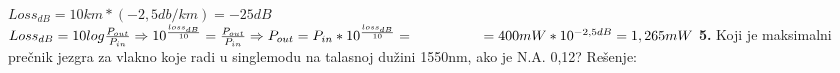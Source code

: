 \documentclass{article}
\begin{document}
$Loss_{dB} = 10km*(-2,5db/km) = -25dB$
\vspace{0.2cm} \newline
\hspace*{0.5cm}$Loss_{dB} = 10log\frac{P_{out}}{P_{in}} \Rightarrow 10^{\frac{loss_{dB}}{10}} = \frac{P_{out}}{P_{in}} \Rightarrow 
P_{out} = P_{in}*10^{\frac{loss_{dB}}{10}} = \vspace{0.05cm}\newline \hspace*{1.65cm} = 400mW*10^{-2,5dB} = 1,265mW$
\vspace*{0.4cm}\newline
\textbf{5.} Koji je maksimalni prečnik jezgra za vlakno koje radi u singlemodu na talasnoj dužini 1550nm,
ako je N.A. 0,12?
\vspace*{0.4cm}\newline
Rešenje: \newline
\end{document}
